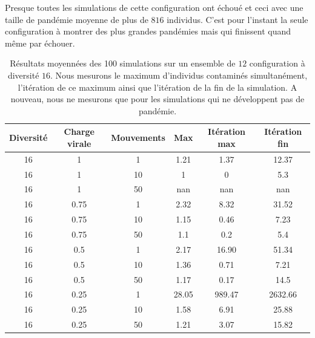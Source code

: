 Presque toutes les simulations de cette configuration ont échoué et ceci avec une taille de pandémie moyenne de plus de $816$ individus. C'est pour l'instant la seule configuration à montrer des plus grandes pandémies mais qui finissent quand même par échouer.

\begin{table}[H]
	\centering
	\renewcommand{\arraystretch}{0.6}
	\captionsetup{justification=centering}
	\caption[Statistiques : diversité 16]{Résultats moyennées des 100 simulations sur un ensemble de $12$ configuration à diversité $16$. Nous mesurons le maximum d'individus contaminés simultanément, l'itération de ce maximum ainsi que l'itération de la fin de la simulation. A nouveau, nous ne mesurons que pour les simulations qui ne développent pas de pandémie.\label{tab:grid}}
	\begin{tabular}{@{\extracolsep{\fill} } |c| c| c| c| c| c|}
		\toprule
		Diversité & Charge virale & Mouvements & Max   & Itération max & Itération fin \\
		\midrule
		16        & 1             & 1          & 1.21  & 1.37          & 12.37         \\
		\midrule
		16        & 1             & 10         & 1     & 0             & 5.3           \\
		\midrule
		16        & 1             & 50         & nan   & nan           & nan           \\
		\midrule
		16        & 0.75          & 1          & 2.32  & 8.32          & 31.52         \\
		\midrule
		16        & 0.75          & 10         & 1.15  & 0.46          & 7.23          \\
		\midrule
		16        & 0.75          & 50         & 1.1   & 0.2           & 5.4           \\
		\midrule
		16        & 0.5           & 1          & 2.17  & 16.90         & 51.34         \\
		\midrule
		16        & 0.5           & 10         & 1.36  & 0.71          & 7.21          \\
		\midrule
		16        & 0.5           & 50         & 1.17  & 0.17          & 14.5          \\
		\midrule
		16        & 0.25          & 1          & 28.05 & 989.47        & 2632.66       \\
		\midrule
		16        & 0.25          & 10         & 1.58  & 6.91          & 25.88         \\
		\midrule
		16        & 0.25          & 50         & 1.21  & 3.07          & 15.82         \\
		\bottomrule
	\end{tabular}
\end{table}

